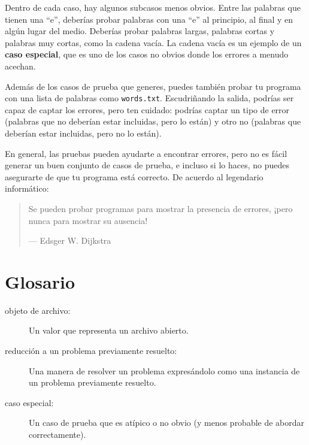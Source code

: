 \documentclass[10pt]{book}
\begin{document}
Dentro de cada caso, hay algunos subcasos menos obvios.  Entre las
palabras que tienen una ``e'', deberías probar palabras con una ``e'' al
principio, al final y en algún lugar del medio.  Deberías probar palabras
largas, palabras cortas y palabras muy cortas, como la cadena vacía.  La
cadena vacía es un ejemplo de un {\bf caso especial}, que es uno de
los casos no obvios donde los errores a menudo acechan.

Además de los casos de prueba que generes, puedes también probar
tu programa con una lista de palabras como {\tt words.txt}.  Escudriñando
la salida, podrías ser capaz de captar los errores, pero ten cuidado:
podrías captar un tipo de error (palabras que no deberían estar
incluidas, pero lo están) y otro no (palabras que deberían estar incluidas,
pero no lo están).

En general, las pruebas pueden ayudarte a encontrar errores, pero no es fácil
generar un buen conjunto de casos de prueba, e incluso si lo haces, no puedes
asegurarte de que tu programa está correcto.
De acuerdo al legendario informático:

\begin{quote}
Se pueden probar programas para mostrar la presencia de errores, ¡pero nunca para
mostrar su ausencia!

--- Edsger W. Dijkstra
\end{quote}


\section{Glosario}

\begin{description}

\item[objeto de archivo:] Un valor que representa un archivo abierto.

\item[reducción a un problema previamente resuelto:] Una manera de resolver un
  problema expresándolo como una instancia de un problema previamente
  resuelto.  

\item[caso especial:] Un caso de prueba que es atípico o no obvio
(y menos probable de abordar correctamente).

\end{description}
\end{document}
